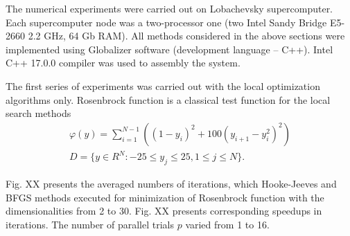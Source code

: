 \documentclass[runningheads]{llncs}
\begin{document}
The numerical experiments were carried out on Lobachevsky supercomputer. Each supercomputer node was a two-processor one (two Intel Sandy Bridge E5-2660 2.2 GHz, 64 Gb RAM). All methods considered in the above sections were implemented using Globalizer software \cite{globalizerSystem} (development language – C++). Intel C++ 17.0.0 compiler was used to assembly the system.

The first series of experiments was carried out with the local optimization algorithms only. Rosenbrock function is a classical test function for the local search methods 
\begin{gather}
    \varphi(y) = \sum_{i=1}^{N-1} \left((1-y_i)^2 + 100(y_{i+1} - y_i^2)^2\right) \nonumber \\
    D = \{ y \in R^N: -25 \leq y_j \leq 25, 1 \leq j \leq N \}. \nonumber
\end{gather}

Fig. XX presents the averaged numbers of iterations, which Hooke-Jeeves and BFGS methods executed for minimization of Rosenbrock function with the dimensionalities from 2 to 30. Fig. XX presents corresponding speedups in iterations. The number of parallel trials $p$ varied from 1 to 16.
\end{document}
